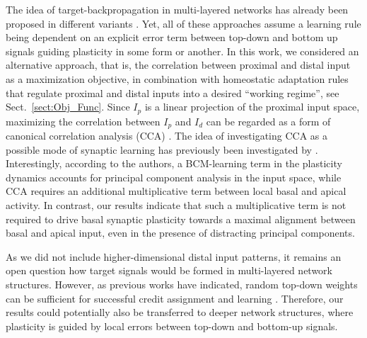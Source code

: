 \documentclass[10pt,a4paper,twocolumn]{article}
\begin{document}
		The idea of target-backpropagation in multi-layered networks
		has already been proposed in different variants
		\cite{Bengio2014,Lee2015,Guerguiev2017}. Yet, all of these approaches
		assume a learning rule being dependent on an explicit error term 
		between top-down and bottom up signals guiding plasticity in some form
		or another. In this work, we considered an alternative approach, that is,
		the correlation between proximal and distal input as a maximization
		objective, in combination with homeostatic adaptation rules that regulate
		proximal and distal inputs into a desired ``working regime'', 
		see Sect.~\ref{sect:Obj_Func}. 
		Since $I_p$ is a linear projection of the 
		proximal input space, maximizing the correlation between
		$I_p$ and $I_d$ can be regarded as a form of canonical correlation
		analysis (CCA) \cite{Haerdle2007}. The idea of investigating CCA as a
		possible mode of synaptic learning has previously been investigated by
		\citet{Haga2018}. Interestingly, according to the authors, a 
		BCM-learning term in the plasticity dynamics accounts for principal component
		analysis in the input space, while CCA requires an additional multiplicative
		term between local basal and apical activity. In contrast, our results
		indicate that such a multiplicative term is not required to drive basal
		synaptic plasticity towards a maximal alignment between basal and apical
		input, even in the presence of distracting principal components.
		
		As we did not include higher-dimensional distal input patterns, it
		remains an open question how target signals would be formed in
		multi-layered network structures. However, as previous works have
		indicated, random top-down weights can be sufficient for
		successful credit assignment and learning \cite{Lillicrap2016,Guerguiev2017}.
		Therefore, our results could potentially also be transferred to deeper
		network structures, where plasticity is guided by local errors between
		top-down and bottom-up signals.
		
		
		
\end{document}
